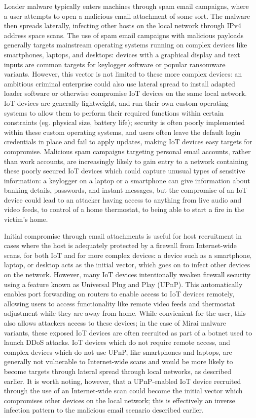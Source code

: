 \documentclass[10pt,sigconf]{acmart}
\begin{document}
Loader malware typically enters machines through spam email campaigns, where a user attempts to open a malicious email attachment of some sort.
The malware then spreads laterally, infecting other hosts on the local network through IPv4 address space scans.
The use of spam email campaigns with malicious payloads generally targets mainstream operating systems running on complex devices like smartphones, laptops, and desktops: devices with a graphical display and text inputs are common targets for keylogger software or popular ransomware variants.
However, this vector is not limited to these more complex devices: an ambitious criminal enterprise could also use lateral spread to install adapted loader software or otherwise compromise IoT devices on the same local network.
IoT devices are generally lightweight, and run their own custom operating systems to allow them to perform their required functions within certain constraints (eg. physical size, battery life);
security is often poorly implemented within these custom operating systems, and users often leave the default login credentials in place and fail to apply updates, making IoT devices easy targets for compromise.
Malicious spam campaigns targeting personal email accounts, rather than work accounts, are increasingly likely to gain entry to a network containing these poorly secured IoT devices which could capture unusual types of sensitive information:
a keylogger on a laptop or a smartphone can give information about banking details, passwords, and instant messages, but the compromise of an IoT device could lead to an attacker having access to anything from live audio and video feeds, to control of a home thermostat, to being able to start a fire in the victim's home.

Initial compromise through email attachments is useful for host recruitment in cases where the host is adequately protected by a firewall from Internet-wide scans, for both IoT and for more complex devices:
a device such as a smartphone, laptop, or desktop acts as the initial vector, which goes on to infect other devices on the network.
However, many IoT devices intentionally weaken firewall security using a feature known as Universal Plug and Play (UPnP).
This automatically enables port forwarding on routers to enable access to IoT devices remotely, allowing users to access functionality like remote video feeds and thermostat adjustment while they are away from home.
While convienient for the user, this also allows attackers access to these devices;
in the case of Mirai malware variants, these exposed IoT devices are often recruited as part of a botnet used to launch DDoS attacks.
IoT devices which do not require remote access, and complex devices which do not use UPnP, like smartphones and laptops, are generally not vulnerable to Internet-wide scans and would be more likely to become targets through lateral spread through local networks, as described earlier.
It is worth noting, however, that a UPnP-enabled IoT device recruited through the use of an Internet-wide scan could become the initial vector which compromises other devices on the local network;
this is effectively an inverse infection pattern to the malicious email scenario described earlier.
\end{document}
